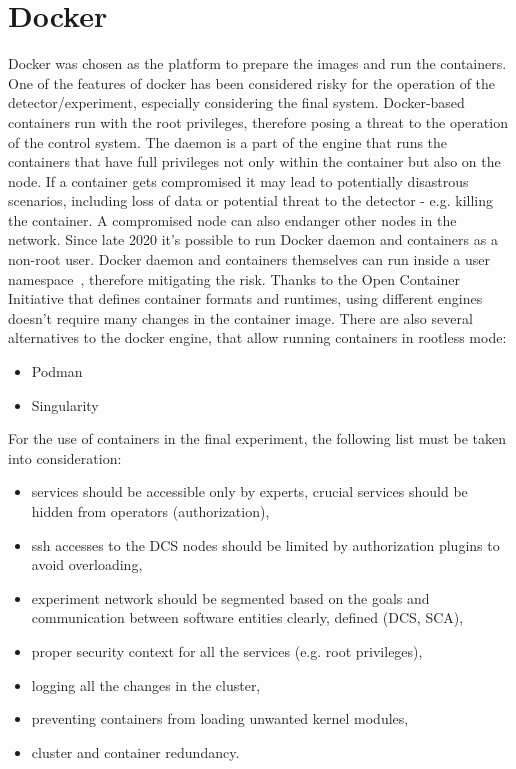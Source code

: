 \section{Docker}
Docker was chosen as the platform to prepare the images and run the containers. One of the features of docker has been considered risky for the operation of the detector/experiment, especially considering the final system. Docker-based containers run with the root privileges, therefore posing a threat to the operation of the control system. The daemon is a part of the engine that runs the containers that have full privileges not only within the container but also on the node. If a container gets compromised it may lead to potentially disastrous scenarios, including loss of data or potential threat to the detector - e.g. killing the container. A compromised node can also endanger other nodes in the network.  Since late 2020 it's possible to run Docker daemon and containers as a non-root user. Docker daemon and containers themselves can run inside a user namespace~\cite{docker_limitations}, therefore mitigating the risk.
 Thanks to the Open Container Initiative that defines container formats and runtimes, using different engines doesn't require many changes in the container image. There are also several alternatives to the docker engine, that allow running containers in rootless mode:
\begin{itemize}
    \item Podman~\cite{Podman} 
    \item Singularity~\cite{singularity}
\end{itemize}

For the use of containers in the final experiment, the following list must be taken into consideration:

\begin{itemize}
    \item services should be accessible only by experts, crucial services should be hidden from operators (authorization),
    \item ssh accesses to the DCS nodes should be limited by authorization plugins to avoid overloading,
    \item experiment network should be segmented based on the goals and communication between software entities clearly, defined (\gls{DCS}, \gls{SCA}),
    \item proper security context for all the services (e.g. root privileges),
    \item logging all the changes in the cluster,
    \item preventing containers from loading unwanted kernel modules,
    \item cluster and container redundancy.
\end{itemize}


